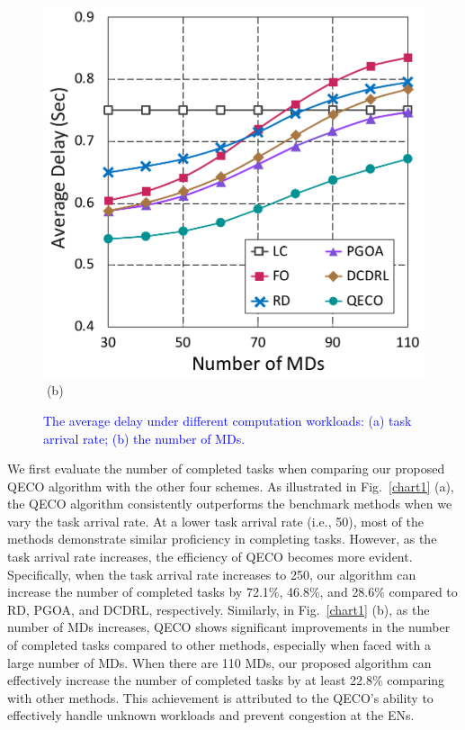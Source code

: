 \documentclass[10pt, journal,letterpaper]{IEEEtran}
\begin{document}
\begin{figure}[tbp]
\begin{minipage}[b]{0.50\linewidth}
		\includegraphics[width=\textwidth]{ delay_2}
		\textcolor{white}{i}\hspace{0.6cm}(b)
	\end{minipage}
	\vspace{-0.7cm}
	\caption{\textcolor{blue}{The average delay under different computation workloads: (a) task arrival rate; (b) the number of MDs.}}
	\label{chart3}
\end{figure} 




We first evaluate the number of completed tasks when comparing our proposed QECO algorithm with the other four schemes. As illustrated in Fig.~\ref{chart1} (a), the QECO algorithm consistently outperforms the benchmark methods when we vary the task arrival rate. At a lower task arrival rate (i.e., 50), most of the methods demonstrate similar proficiency in completing tasks. However, as the task arrival rate increases, the efficiency of QECO becomes more evident. Specifically, when the task arrival rate increases to 250, our algorithm can increase the number of completed tasks by 72.1\%, 46.8\%, and 28.6\% compared to RD, PGOA, and DCDRL, respectively.
Similarly, in Fig.~\ref{chart1} (b), as the number of MDs increases, QECO shows significant improvements in the number of completed tasks compared to other methods, especially when faced with a large number of MDs. When there are 110 MDs, our proposed algorithm can effectively increase the number of completed tasks by at least 22.8\% comparing with other methods. This achievement is attributed to the QECO's ability to effectively handle unknown workloads and prevent congestion at the ENs.
\end{document}
